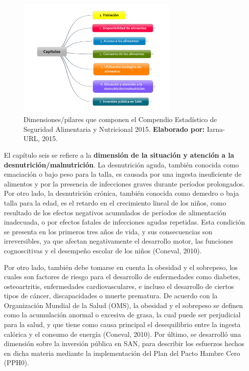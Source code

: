 \begin{figure}
	\centering
	\includegraphics[width=0.7\textwidth]{Mapacap}
	\caption{Dimensiones/pilares que componen el Compendio Estadístico de Seguridad Alimentaria y Nutricional 2015. \textbf{Elaborado por:} Iarna-URL, 2015.}
	\label{figura3}
\end{figure}

El capítulo seis se refiere a la  \textbf{dimensión de la situación y atención a la desnutrición/malnutrición}. La desnutrición aguda, también conocida como emaciación o bajo peso para la talla, es causada por una ingesta insuficiente de alimentos y por la presencia de infecciones graves durante períodos prolongados. Por otro lado, la desnutrición crónica, también conocida como demedro o baja talla para la edad, es el retardo en el crecimiento lineal de los niños, como resultado de los efectos negativos acumulados de períodos de alimentación inadecuada, o por efectos fatales de infecciones agudas repetidas. Esta condición se presenta en los primeros tres años de vida, y sus consecuencias son irreversibles, ya que afectan negativamente el desarrollo motor, las funciones cognoscitivas y el desempeño escolar de los niños (Coneval, 2010). 

Por otro lado, también debe tomarse en cuenta la obesidad y el sobrepeso, los cuales son factores de riesgo para el desarrollo de enfermedades como diabetes, osteoartritis, enfermedades cardiovasculares, e incluso el desarrollo de ciertos tipos de cáncer, discapacidades o muerte prematura. De acuerdo con la Organización Mundial de la Salud (OMS), la obesidad y el sobrepeso se definen como la acumulación anormal o excesiva de grasa, la cual puede ser perjudicial para la salud, y que tiene como causa principal el desequilibrio entre la ingesta calórica y el consumo de energía (Coneval, 2010). Por último, se desarrolló una dimensión sobre la inversión pública en SAN, para describir los esfuerzos hechos en dicha materia mediante la implementación del Plan del Pacto Hambre Cero (PPH0).


